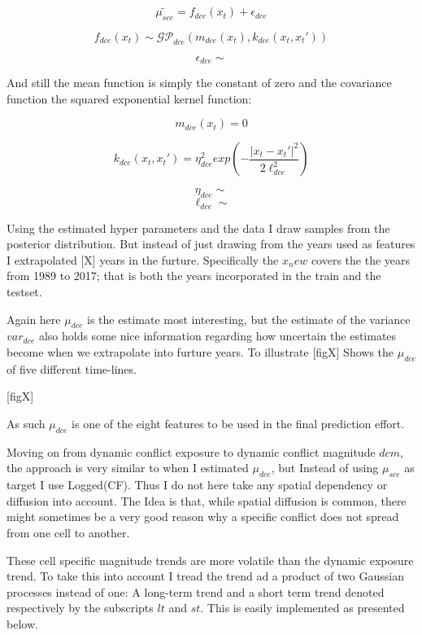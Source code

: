 \documentclass[a4paper]{article}
\begin{document}
\[
\widetilde{\mu_{sce}} = f_{dce}(x_t) + \epsilon_{dce}
\]

\[
f_{dce}(x_t) \sim \mathcal{GP}_{dce}(m_{dce}(x_t),k_{dce}(x_t,x_t')) %
\]

\[
\epsilon_{dce} \sim 
\]

And still the mean function is simply the constant of zero and the covariance function the squared exponential kernel function:

\[
m_{dce}(x_t) = 0
\]

\[
k_{dce}(x_t,x_t') = \eta_{dce}^2 exp\left(-\frac{|x_t-x_t'|^2}{2\ell_{dce}^2}\right) %
\]

\[
\eta_{dce} \sim
\]
\[
\ell_{dce} \sim
\]

Using the estimated hyper parameters and the data I draw samples from the posterior distribution. But instead of just drawing from the years used as features I extrapolated [X] years in the furture. Specifically the $x_new$ covers the the years from 1989 to 2017; that is both the years incorporated in the train and the testset.\par

Again here $\mu_{dce}$ is the estimate most interesting, but the estimate of the variance $var_{dce}$ also holds some nice information regarding how uncertain the estimates become when we extrapolate into furture years. To illustrate [figX] Shows the $\mu_{dce}$ of five different time-lines.\par

[figX]

As such $\mu_{dce}$ is one of the eight features to be used in the final prediction effort. 


Moving on from dynamic conflict exposure to dynamic conflict magnitude $dcm$, the approach is very similar to when I estimated $\mu_{dce}$, but Instead of using $\mu_{sce}$ as target I use Logged(CF). Thus I do not here take any spatial dependency or diffusion into account. The Idea is that, while spatial diffusion is common, there might sometimes be a very good reason why a specific conflict does not spread from one cell to another.\par

These cell specific magnitude trends are more volatile than the dynamic exposure trend. To take this into account I tread the trend ad a product of two Gaussian processes instead of one: A long-term trend and a short term trend denoted respectively by the subscripts $lt$ and $st$. This is easily implemented as presented below.\par
\end{document}
